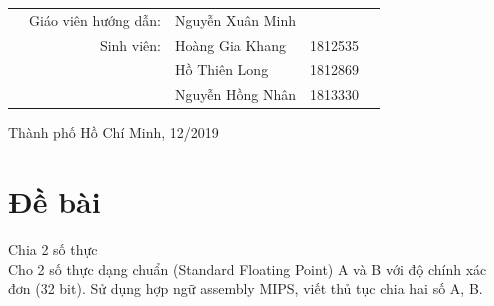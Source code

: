 \documentclass[a4paper]{article}
\begin{document}
\begin{titlepage}
		
		
		\begin{table}[h]
			\begin{tabular}{rrlrr}
				\hspace{3cm}
				& {\large Giáo viên hướng dẫn}: & {\large Nguyễn Xuân Minh}   &         & \\
				& {\large Sinh viên}:           & {\large Hoàng Gia Khang } & 1812535 & \\
				& {}                            & {\large Hồ Thiên Long } & 1812869 & \\
				& {}                            & {\large Nguyễn Hồng Nhân } & 1813330 & \\
			\end{tabular}
		\end{table}
		
		\vspace{2cm}
		
		\begin{center}
			{\footnotesize Thành phố Hồ Chí Minh, 12/2019}
		\end{center}
		
	\end{titlepage}

\newpage
\thispagestyle{empty}
\tableofcontents

\newpage

\section{Đề bài}
Chia 2 số thực \\
Cho 2 số thực dạng chuẩn (Standard Floating Point) A và B với độ chính xác đơn (32 bit). Sử dụng hợp ngữ assembly MIPS, viết thủ tục chia hai số A, B.
\end{document}
